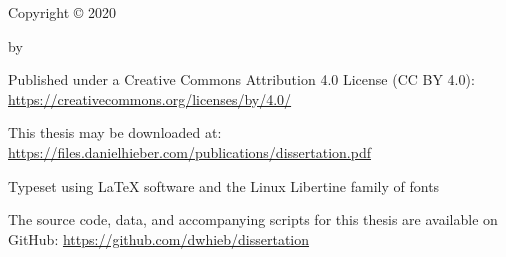 \setcounter{page}{3}

\vspace*{\fill}

\begin{center}

  \thetitle

  \vspace{3em}

  Copyright {\copyright} 2020

  by

  \theauthor

\end{center}

\vspace*{\fill}

\begin{flushleft}
\begin{singlespacing}

  \setlength{\parskip}{0.5em}

  Published under a Creative Commons Attribution 4.0 License (CC BY 4.0): \href{https://creativecommons.org/licenses/by/4.0/}{https://creativecommons.org/licenses/by/4.0/}

  This thesis may be downloaded at: \href{https://files.danielhieber.com/publications/dissertation.pdf}{https://files.danielhieber.com/publications/dissertation.pdf}

  Typeset using {\LaTeX} software and the Linux Libertine family of fonts

  The source code, data, and accompanying scripts for this thesis are available on GitHub: \href{https://github.com/dwhieb/dissertation}{https://github.com/dwhieb/dissertation}

  \setlength{\parskip}{0em}

\end{singlespacing}
\end{flushleft}
